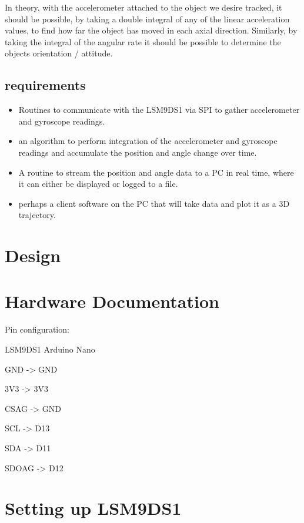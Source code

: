 \documentclass[10pt, a4paper]{article}
\begin{document}
In theory, with the accelerometer attached to the object we desire tracked, it should be possible, by taking a double integral of any of the linear acceleration values, to find how far the object has moved in each axial direction. Similarly, by taking the integral of the angular rate it should be possible to determine the objects orientation / attitude.

\subsection{requirements}

\begin{itemize}
    \item Routines to communicate with the LSM9DS1 via SPI to gather accelerometer and gyroscope readings.
    \item an algorithm to perform integration of the accelerometer and gyroscope readings and accumulate the position and angle change over time.
    \item A routine to stream the position and angle data to a PC in real time, where it can either be displayed or logged to a file.
    \item perhaps a client software on the PC that will take data and plot it as a 3D trajectory.
\end{itemize}

\section{Design}

\section{Hardware Documentation}

Pin configuration:

LSM9DS1             Arduino Nano

GND         ->      GND

3V3         ->      3V3

CSAG        ->      GND

SCL         ->      D13

SDA         ->      D11

SDOAG       ->      D12

\section{Setting up LSM9DS1}
\end{document}
